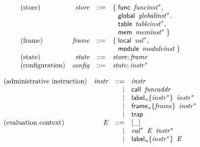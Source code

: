 \vspace{1ex}

$$
\begin{array}{@{}lrrl@{}l@{}}
\mbox{(store)} & {\mathit{store}} &::=& \{\; \begin{array}[t]{@{}l@{}l@{}}
\mathsf{func}~\,{{\mathit{funcinst}}^\ast},\; \\
  \mathsf{global}~\,{{\mathit{globalinst}}^\ast},\; \\
  \mathsf{table}~\,{{\mathit{tableinst}}^\ast},\; \\
  \mathsf{mem}~\,{{\mathit{meminst}}^\ast} \;\}\end{array} \\
\mbox{(frame)} & {\mathit{frame}} &::=& \{\; \begin{array}[t]{@{}l@{}l@{}}
\mathsf{local}~\,{{\mathit{val}}^\ast},\; \\
  \mathsf{module}~\,{\mathit{moduleinst}} \;\}\end{array} \\
\mbox{(state)} & {\mathit{state}} &::=& {\mathit{store}} ; {\mathit{frame}} \\
\mbox{(configuration)} & {\mathit{config}} &::=& {\mathit{state}} ; {{\mathit{instr}}^\ast} \\
\end{array}
$$

\vspace{1ex}

$$
\begin{array}{@{}lrrl@{}l@{}}
\mbox{(administrative instruction)} & {\mathit{instr}} &::=& {\mathit{instr}} \\ &&|&
\mathsf{call}~\,{\mathit{funcaddr}} \\ &&|&
{{\mathsf{label}}_{{\mathit{n}}}}{\{{{\mathit{instr}}^\ast}\}}~\,{{\mathit{instr}}^\ast} \\ &&|&
{{\mathsf{frame}}_{{\mathit{n}}}}{\{{\mathit{frame}}\}}~\,{{\mathit{instr}}^\ast} \\ &&|&
\mathsf{trap} \\
\mbox{(evaluation context)} & {\mathit{E}} &::=& {}[\mathsf{\_}] \\ &&|&
{{\mathit{val}}^\ast}~\,{\mathit{E}}~\,{{\mathit{instr}}^\ast} \\ &&|&
{{\mathsf{label}}_{{\mathit{n}}}}{\{{{\mathit{instr}}^\ast}\}}~\,{\mathit{E}} \\
\end{array}
$$

\vspace{1ex}

